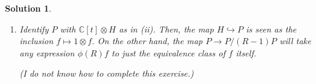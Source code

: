 \documentclass{article}
\theoremstyle{nonumberplain}
\newtheorem{sol}{Solution}
\newcommand{\C}{\mathbb{C}}
\begin{document}
\begin{sol}
\begin{enumerate}
\item Identify $P$ with $\C[t] \otimes H$ as in (ii). Then, the map $H \hookrightarrow P$ is seen as the inclusion $f \mapsto 1 \otimes f$. On the other hand, the map $P \to P/(R-1)P$ will take any expression $\phi(R) f$ to just the equivalence class of $f$ itself.

(I do not know how to complete this exercise.)
\end{enumerate}
\end{sol}
\end{document}
